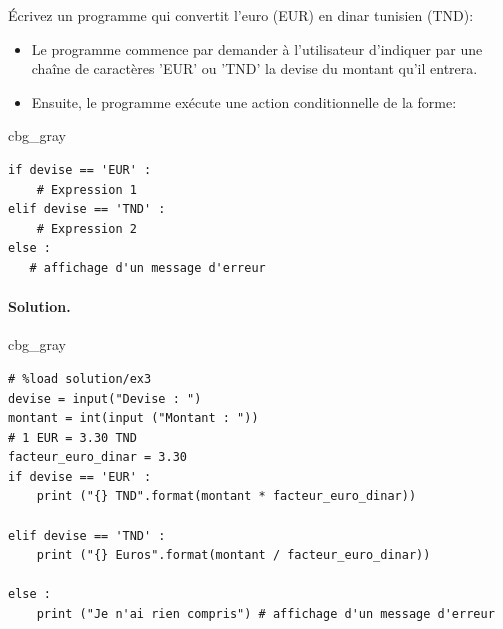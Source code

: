 \documentclass[%
oneside,                 %
final,                   %
10pt,french]{article}
\newenvironment{_cod_tight}[1]{
   \def\FrameCommand{\colorbox{#1}}
   \FrameRule0.6pt\MakeFramed {\FrameRestore}\vskip3mm}
   {\vskip0mm\endMakeFramed}
\newenvironment{cod}[1]{
\bgroup\rmfamily
\fboxsep=0mm\relax
\begin{_cod_tight}{#1}
\list{}{\parsep=-2mm\parskip=0mm\topsep=0pt\leftmargin=2mm
\rightmargin=2\leftmargin\leftmargin=4pt\relax}
\item\relax}
{\endlist\end{_cod_tight}\egroup}
\newenvironment{doconceexercise}{}{}
\newcounter{doconceexercisecounter}
\begin{document}
\begin{doconceexercise}



Écrivez un programme qui convertit l'euro (EUR) en dinar tunisien (TND):

\begin{itemize}
\item Le programme commence par demander à l'utilisateur d'indiquer par une chaîne de caractères 'EUR' ou 'TND' la devise du montant qu'il entrera.

\item Ensuite, le programme exécute une action conditionnelle de la forme:
\end{itemize}

\noindent
\begin{cod}{cbg_gray}\begin{verbatim}
if devise == 'EUR' :
    # Expression 1
elif devise == 'TND' :
    # Expression 2
else :
   # affichage d'un message d'erreur
\end{verbatim}
\end{cod}
\noindent


\paragraph{Solution.}
\begin{cod}{cbg_gray}\begin{verbatim}
# %load solution/ex3
devise = input("Devise : ")
montant = int(input ("Montant : "))
# 1 EUR = 3.30 TND
facteur_euro_dinar = 3.30
if devise == 'EUR' :
    print ("{} TND".format(montant * facteur_euro_dinar))

elif devise == 'TND' :
    print ("{} Euros".format(montant / facteur_euro_dinar))

else :
    print ("Je n'ai rien compris") # affichage d'un message d'erreur
\end{verbatim}
\end{cod}
\noindent


\end{doconceexercise}
\end{document}
